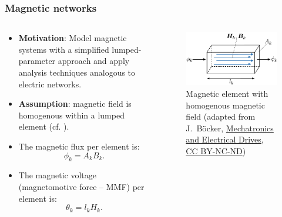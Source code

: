 \begin{frame}
	\frametitle{Magnetic networks}
	\begin{columns}
		\begin{column}{0.575\textwidth}
			\begin{itemize}
                \item \textbf{Motivation}: Model magnetic systems with a simplified lumped-parameter approach and apply analysis techniques analogous to electric networks.
                \item \textbf{Assumption}: magnetic field is homogenous within a lumped element (cf. ).
                \item The magnetic flux per element is:
                \begin{equation}
                    \phi_k = A_k B_k .
                \end{equation}
                \item The magnetic voltage (magnetomotive force -- MMF) per element is:
                \begin{equation}
                    \theta_k = l_k H_k .
                \end{equation}
            \end{itemize}
		\end{column}
        \hfill
		\begin{column}{0.425\textwidth}
			\begin{figure}
				\centering
				\includegraphics[height=0.4\textheight]{fig/lec02/Reluctance_element.pdf}
				\caption{Magnetic element with homogenous magnetic field (adapted from J.~B\"ocker, \href{https://digital.ub.uni-paderborn.de/doi/10.17619/UNIPB/1-1640}{Mechatronics and Electrical Drives}, \href{https://creativecommons.org/licenses/by-nc-nd/4.0/deed.en}{CC BY-NC-ND})}
                \label{fig:Reluctance_element}
			\end{figure}
		\end{column}
		\end{columns}
\end{frame}

